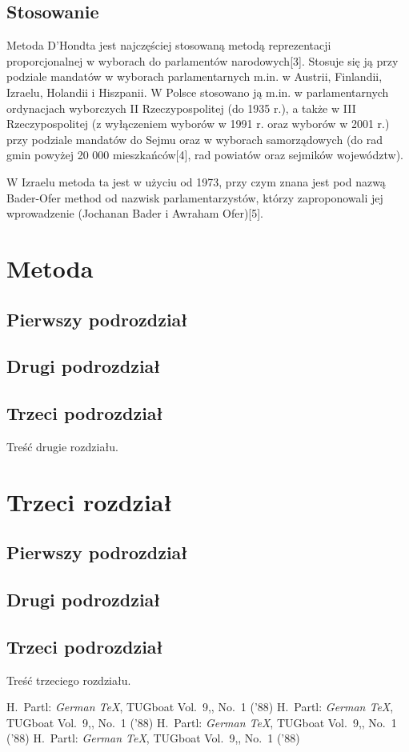 \documentclass[12pt,a4paper,titlepage]{report}
\begin{document}
\section{Stosowanie}
Metoda D’Hondta jest najczęściej stosowaną metodą reprezentacji proporcjonalnej w wyborach do parlamentów narodowych[3]. Stosuje się ją przy podziale mandatów w wyborach parlamentarnych m.in. w Austrii, Finlandii, Izraelu, Holandii i Hiszpanii. W Polsce stosowano ją m.in. w parlamentarnych ordynacjach wyborczych II Rzeczypospolitej (do 1935 r.), a także w III Rzeczypospolitej (z wyłączeniem wyborów w 1991 r. oraz wyborów w 2001 r.) przy podziale mandatów do Sejmu oraz w wyborach samorządowych (do rad gmin powyżej 20 000 mieszkańców[4], rad powiatów oraz sejmików województw).

W Izraelu metoda ta jest w użyciu od 1973, przy czym znana jest pod nazwą Bader-Ofer method od nazwisk parlamentarzystów, którzy zaproponowali jej wprowadzenie (Jochanan Bader i Awraham Ofer)[5].
\newpage
\chapter{Metoda}
\section{Pierwszy podrozdział}


\section{Drugi podrozdział}
\section{Trzeci podrozdział}
\cite{pa}Treść drugie rozdziału.

\newpage
\chapter{Trzeci rozdział}
\section{Pierwszy podrozdział}
\section{Drugi podrozdział}
\section{Trzeci podrozdział}
Treść trzeciego rozdziału.
\newpage

\begin{thebibliography}{99}
 H.~Partl:
\emph{German \TeX},
TUGboat Vol.~9,, No.~1 ('88)
 H.~Partl:
\emph{German \TeX},
TUGboat Vol.~9,, No.~1 ('88)
 H.~Partl:
\emph{German \TeX},
TUGboat Vol.~9,, No.~1 ('88)
 H.~Partl:
\emph{German \TeX},
TUGboat Vol.~9,, No.~1 ('88)
\end{thebibliography}
\end{document}
